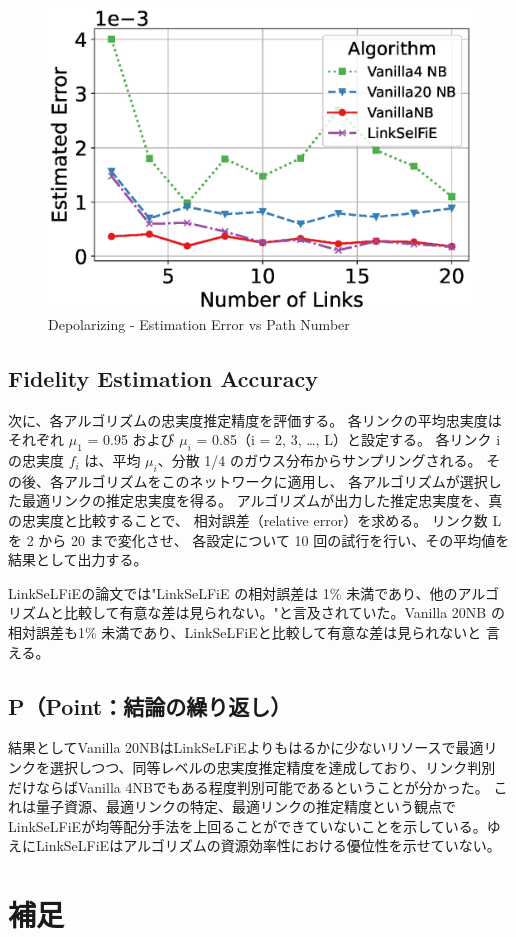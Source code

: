 \documentclass[conference]{IEEEtran}
\begin{document}
\begin{figure}[t]
\centering
\includegraphics[width=0.45\columnwidth]{figure/plot_error_vs_path_num_Depolar.eps}
\caption{Depolarizing - Estimation Error vs Path Number}
\label{fig:error_depolar}
\end{figure}

\subsection{Fidelity Estimation Accuracy}
\label{sec:org0000b24}
次に、各アルゴリズムの忠実度推定精度を評価する。
各リンクの平均忠実度はそれぞれ \(\mu_1\) = 0.95 および \(\mu_i\) = 0.85（i = 2, 3, …, L）と設定する。
各リンク i の忠実度 \(f_i\) は、平均 \(\mu_i\)、分散 1/4 のガウス分布からサンプリングされる。
その後、各アルゴリズムをこのネットワークに適用し、
各アルゴリズムが選択した最適リンクの推定忠実度を得る。
アルゴリズムが出力した推定忠実度を、真の忠実度と比較することで、
相対誤差（relative error）を求める。
リンク数 L を 2 から 20 まで変化させ、
各設定について 10 回の試行を行い、その平均値を結果として出力する。

LinkSeLFiEの論文では"LinkSeLFiE の相対誤差は 1\% 未満であり、他のアルゴ
リズムと比較して有意な差は見られない。"と言及されていた。Vanilla 20NB
の相対誤差も1\% 未満であり、LinkSeLFiEと比較して有意な差は見られないと
言える。




\subsection{P（Point：結論の繰り返し）}
\label{sec:org2929232}
結果としてVanilla 20NBはLinkSeLFiEよりもはるかに少ないリソースで最適リ
ンクを選択しつつ、同等レベルの忠実度推定精度を達成しており、リンク判別
だけならばVanilla 4NBでもある程度判別可能であるということが分かった。
これは量子資源、最適リンクの特定、最適リンクの推定精度という観点で
LinkSeLFiEが均等配分手法を上回ることができていないことを示している。ゆ
えにLinkSeLFiEはアルゴリズムの資源効率性における優位性を示せていない。


\section{補足}
\label{sec:org7d6d641}
\end{document}
